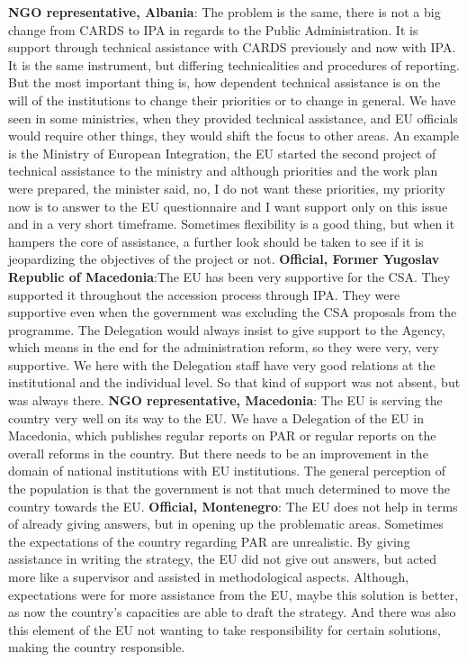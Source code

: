 \textbf{NGO representative, Albania}: The problem is the same, there is not a big change from CARDS to IPA in regards to the Public Administration. It is support through technical assistance with CARDS previously and now with IPA. It is the same instrument, but differing technicalities and procedures of reporting. But the most important thing is, how dependent technical assistance is on the will of the institutions to change their priorities or to change in general. We have seen in some ministries, when they provided technical assistance, and EU officials would require other things, they would shift the focus to other areas. An example is the Ministry of European Integration, the EU started the second project of technical assistance to the ministry and although priorities and the work plan were prepared, the minister said, no, I do not want these priorities, my priority now is to answer to the EU questionnaire and I want support only on this issue and in a very short timeframe. Sometimes flexibility is a good thing, but when it hampers the core of assistance, a further look should be taken to see if it is jeopardizing the objectives of the project or not. 
\textbf{Official, Former Yugoslav Republic of Macedonia}:The EU has been very supportive for the CSA. They supported it throughout the accession process through IPA. They were supportive even when the government was excluding the CSA proposals from the programme. The Delegation would always insist to give support to the Agency, which means in the end for the administration reform, so they were very, very supportive. We here with the Delegation staff have very good relations at the institutional and the individual level. So that kind of support was not absent, but was always there.
\textbf{NGO representative, Macedonia}: The EU is serving the country very well on its way to the EU. We have a Delegation of the EU in Macedonia, which publishes regular reports on PAR or regular reports on the overall reforms in the country. But there needs to be an improvement in the domain of national institutions with EU institutions. The general perception of the population is that the government is not that much determined to move the country towards the EU. 
\textbf{Official, Montenegro}: The EU does not help in terms of already giving answers, but in opening up the problematic areas. Sometimes the expectations of the country regarding PAR are unrealistic. By giving assistance in writing the strategy, the EU did not give out answers, but acted more like a supervisor and assisted in methodological aspects. Although, expectations were for more assistance from the EU, maybe this solution is better, as now the country’s capacities are able to draft the strategy. And there was also this element of the EU not wanting to take responsibility for certain solutions, making the country responsible. 
